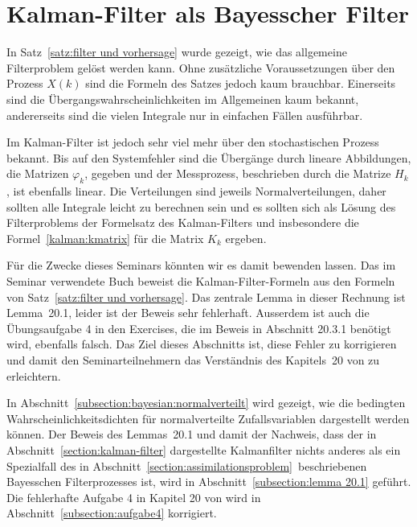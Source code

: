%
%
%

\newtheorem*{lemma*}{Lemma}

\section{Kalman-Filter als Bayesscher Filter}
In Satz~\ref{satz:filter und vorhersage} wurde gezeigt, wie das allgemeine
Filterproblem gelöst werden kann.
Ohne zusätzliche Voraussetzungen über den Prozess $X(k)$ sind die Formeln
des Satzes jedoch kaum brauchbar.
Einerseits sind die Übergangswahrscheinlichkeiten im Allgemeinen kaum
bekannt, andererseits sind die vielen Integrale nur in einfachen
Fällen ausführbar.

Im Kalman-Filter ist jedoch sehr viel mehr über den stochastischen 
Prozess bekannt.
Bis auf den Systemfehler sind die Übergänge durch lineare Abbildungen,
die Matrizen $\varphi_k$, gegeben und der Messprozess, beschrieben durch
die Matrize $H_k$, ist ebenfalls linear.
Die Verteilungen sind jeweils Normalverteilungen, daher sollten
alle Integrale leicht zu berechnen sein und es sollten sich als Lösung
des Filterproblems der Formelsatz des Kalman-Filters und insbesondere
die Formel~\eqref{kalman:kmatrix} für die Matrix $K_k$ ergeben.

Für die Zwecke dieses Seminars könnten wir es damit bewenden lassen.
Das im Seminar verwendete Buch \cite{skript:kaperengler} beweist die
Kalman-Filter-Formeln aus den Formeln von Satz~\ref{satz:filter und vorhersage}.
Das zentrale Lemma in dieser Rechnung ist Lemma~20.1, leider ist
der Beweis sehr fehlerhaft.
Ausserdem ist auch die Übungsaufgabe 4 in den Exercises, die im Beweis in
Abschnitt 20.3.1 benötigt wird, ebenfalls falsch.
Das Ziel dieses Abschnitts ist, diese Fehler zu korrigieren und damit
den Seminarteilnehmern das Verständnis des Kapitels~20 von
\cite{skript:kaperengler} zu erleichtern.

In Abschnitt~\ref{subsection:bayesian:normalverteilt} wird gezeigt,
wie die bedingten Wahrscheinlichkeitsdichten für normalverteilte
Zufallsvariablen dargestellt werden können.
Der Beweis des Lemmas~20.1 und damit der Nachweis, dass der in
Abschnitt~\ref{section:kalman-filter} dargestellte Kalmanfilter nichts
anderes als ein Spezialfall des in
Abschnitt~\ref{section:assimilationsproblem} beschriebenen Bayesschen
Filterprozesses ist, wird in Abschnitt~\ref{subsection:lemma 20.1}
geführt.
Die fehlerhafte Aufgabe 4 in Kapitel 20 von \cite{skript:kaperengler}
wird in Abschnitt~\ref{subsection:aufgabe4} korrigiert.

